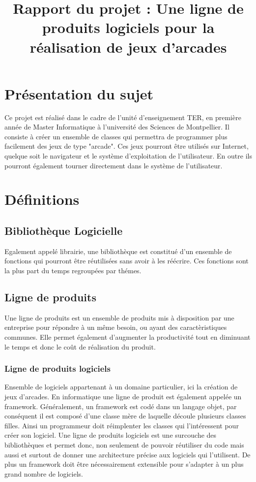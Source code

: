 \documentclass{article}
\title{Rapport du projet : Une ligne de produits logiciels pour la réalisation de jeux d'arcades}
\begin{document}
\maketitle{}

\tableofcontents

\newpage

\section{Présentation du sujet}

	Ce projet est réalisé dans le cadre de l'unité d'enseignement TER, en première année de Master Informatique à l'université des Sciences de Montpellier.
	\indent Il consiste à créer un ensemble de classes qui permettra de programmer plus facilement des jeux de type "arcade". Ces jeux pourront être utilisés sur Internet, quelque soit le navigateur et le système d'exploitation de l'utilisateur. En outre ils pourront également tourner directement dans le système de l'utilisateur.

\section{Définitions}

	\subsection{Bibliothèque Logicielle}
		Egalement appelé librairie, une bibliothèque est constitué d'un ensemble de fonctions qui pourront être réutilisées sans avoir à les réécrire. Ces fonctions sont la plus part du temps regroupées par thémes.

	\subsection{Ligne de produits}
		Une ligne de produits est un ensemble de produits mis à disposition par une entreprise pour répondre à un même besoin, ou ayant des caractèristiques communes. Elle permet également d'augmenter la productivité tout en diminuant le temps et donc le coût de réalisation du produit.
		\subsubsection*{Ligne de produits logiciels}
			Ensemble de logiciels appartenant à un domaine particulier, ici la création de jeux d'arcades. En informatique une ligne de produit est également appelée un framework. Généralement, un framework est codé dans un langage objet, par conséquent il est composé d'une classe mère de laquelle découle plusieurs classes filles. Ainsi un programmeur doit réimplenter les classes qui l'intéressent pour créer son logiciel. 
			\indent Une ligne de produits logiciels est une surcouche des bibliothèques et permet donc, non seulement de pouvoir réutiliser du code mais aussi et surtout de donner une architecture précise aux logiciels qui l'utilisent. De plus un framework doit être nécessairement extensible pour s'adapter à un plus grand nombre de logiciels.
\end{document}
